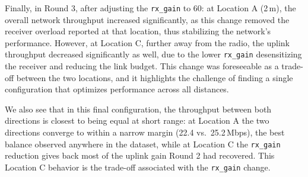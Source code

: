 Finally, in Round 3, after adjusting the \texttt{rx\_gain} to 60: at Location A (2\,m), the overall network throughput increased significantly, as this change removed the receiver overload reported at that location, thus stabilizing the network's performance. However, at Location C, further away from the radio, the uplink throughput decreased significantly as well, due to the lower \texttt{rx\_gain} desensitizing the receiver and reducing the link budget. This change was foreseeable as a trade-off between the two locations, and it highlights the challenge of finding a single configuration that optimizes performance across all distances.

We also see that in this final configuration, the throughput between both directions is closest to being equal at short range: at Location A the two directions converge to within a narrow margin (22.4 vs.\ 25.2\,Mbps), the best balance observed anywhere in the dataset, while at Location C the \texttt{rx\_gain} reduction gives back most of the uplink gain Round 2 had recovered. This Location C behavior is the trade-off associated with the \texttt{rx\_gain} change.

